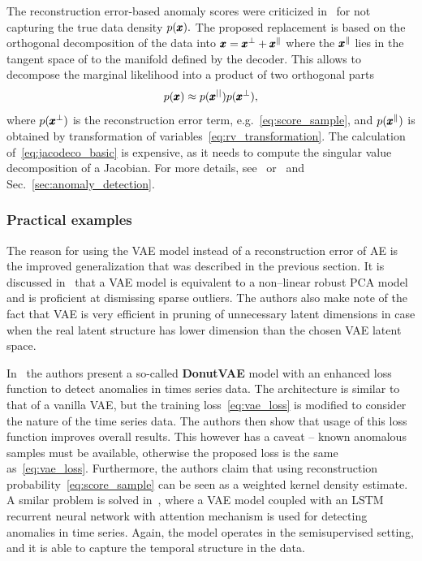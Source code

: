 The reconstruction error-based anomaly scores were criticized in~\cite{pidhorskyi2018generative} for not capturing the true data density $p(\pmb{{x}}).$ The proposed replacement is based on the orthogonal decomposition of the data into $\pmb{{x}}=\pmb{{x}}^\bot + \pmb{{x}}^{\parallel} $ where the $\pmb{{x}}^\parallel$  lies in the tangent space of to the manifold defined by the decoder. This allows to decompose the marginal likelihood into a product of two orthogonal parts
\begin{equation} \label{eq:jacodeco_basic}
    p(\pmb{{x}}) \approx p(\pmb{{x}}^{||})p(\pmb{{x}}^{\perp}),
\end{equation}
where $p(\pmb{{x}}^\bot)$ is the reconstruction error term, e.g.~\eqref{eq:score_sample}, and $p(\pmb{{x}}^\parallel)$ is obtained by transformation of variables~\eqref{eq:rv_transformation}. The calculation of~\eqref{eq:jacodeco_basic} is expensive, as it needs to compute the singular value decomposition of a Jacobian. For more details, see~\cite{pidhorskyi2018generative} or~\cite{vsmidl2019anomaly} and Sec.~\ref{sec:anomaly_detection}.

\subsubsection{Practical examples}
The reason for using the VAE model instead of a reconstruction error of AE is the improved generalization that was described in the previous section. It is discussed in~\cite{dai2017hidden} that a VAE model is equivalent to a non--linear robust PCA model and is proficient at dismissing sparse outliers. The authors also make note of the fact that VAE is very efficient in pruning of unnecessary latent dimensions in case when the real latent structure has lower dimension than the chosen VAE latent space.

In~\cite{xu2018unsupervised} the authors present a so-called \textbf{DonutVAE} model with an enhanced loss function to detect anomalies in times series data. The architecture is similar to that of a vanilla VAE, but the training loss~\eqref{eq:vae_loss} is modified to consider the nature of the time series data. The authors then show that usage of this loss function improves overall results. This however has a caveat -- known anomalous samples must be available, otherwise the proposed loss is the same as~\eqref{eq:vae_loss}. Furthermore, the authors claim that using reconstruction probability~\eqref{eq:score_sample} can be seen as
a weighted kernel density estimate. A smilar problem is solved in~\cite{pereira2018unsupervised}, where a VAE model coupled with an LSTM recurrent neural network with attention mechanism is used for detecting anomalies in time series. Again, the model operates in the semisupervised setting, and it is able to capture the temporal structure in the data.

